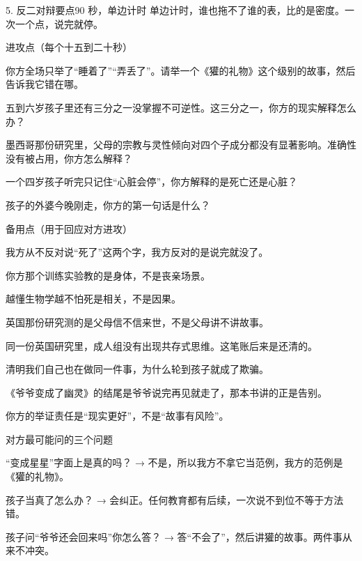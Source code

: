 \documentclass[script,con]{debate}
\begin{document}
\begin{stage}{5. 反二对辩要点}{90 秒，单边计时}
单边计时，谁也拖不了谁的表，比的是密度。一次一个点，说完就停。

\begin{points}{进攻点（每个十五到二十秒）}
\item 你方全场只举了“睡着了”“弄丢了”。请举一个《獾的礼物》这个级别的故事，然后告诉我它错在哪。
\item 五到六岁孩子里还有三分之一没掌握不可逆性。这三分之一，你方的现实解释怎么办？
\item 墨西哥那份研究里，父母的宗教与灵性倾向对四个子成分都没有显著影响。准确性没有被占用，你方怎么解释？
\item 一个四岁孩子听完只记住“心脏会停”，你方解释的是死亡还是心脏？
\item 孩子的外婆今晚刚走，你方的第一句话是什么？
\end{points}
\begin{points}{备用点（用于回应对方进攻）}
\item 我方从不反对说“死了”这两个字，我方反对的是说完就没了。
\item 你方那个训练实验教的是身体，不是丧亲场景。
\item 越懂生物学越不怕死是相关，不是因果。
\item 英国那份研究测的是父母信不信来世，不是父母讲不讲故事。
\item 同一份英国研究里，成人组没有出现共存式思维。这笔账后来是还清的。
\item 清明我们自己也在做同一件事，为什么轮到孩子就成了欺骗。
\item 《爷爷变成了幽灵》的结尾是爷爷说完再见就走了，那本书讲的正是告别。
\item 你方的举证责任是“现实更好”，不是“故事有风险”。
\end{points}
\begin{points}{对方最可能问的三个问题}
\item “变成星星”字面上是真的吗？ → 不是，所以我方不拿它当范例，我方的范例是《獾的礼物》。
\item 孩子当真了怎么办？ → 会纠正。任何教育都有后续，一次说不到位不等于方法错。
\item 孩子问“爷爷还会回来吗”你怎么答？ → 答“不会了”，然后讲獾的故事。两件事从来不冲突。
\end{points}
\end{stage}
\end{document}

